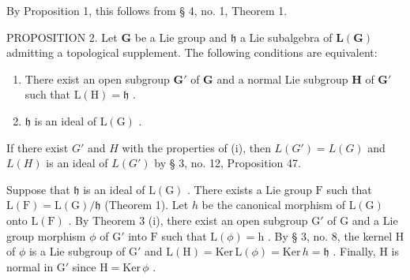 By Proposition 1, this follows from § 4, no. 1, Theorem 1.

PROPOSITION 2. Let \(\mathbf{G}\) be a Lie group and \(\mathfrak{h}\) a Lie subalgebra of \(\mathbf{L}(\mathbf{G})\) admitting a topological supplement. The following conditions are equivalent:

\begin{enumerate}
\def\labelenumi{(\roman{enumi})}
\item
  There exist an open subgroup \(\mathbf{G}'\) of \(\mathbf{G}\) and a normal Lie subgroup \(\mathbf{H}\) of \(\mathbf{G}'\) such that \(\mathrm{L(H)} = \mathfrak{h}\) .
\item
  \(\mathfrak{h}\) is an ideal of \(\mathrm{L}(\mathrm{G})\) .
\end{enumerate}

If there exist \(G'\) and \(H\) with the properties of (i), then \(L(G') = L(G)\) and \(L(H)\) is an ideal of \(L(G')\) by § 3, no. 12, Proposition 47.

Suppose that \(\mathfrak{h}\) is an ideal of \(\mathrm{L}(\mathrm{G})\) . There exists a Lie group \(\mathrm{F}\) such that \(\mathrm{L}(\mathrm{F}) = \mathrm{L}(\mathrm{G}) / \mathfrak{h}\) (Theorem 1). Let \(h\) be the canonical morphism of \(\mathrm{L}(\mathrm{G})\) onto \(\mathrm{L}(\mathrm{F})\) . By Theorem 3 (i), there exist an open subgroup \(\mathrm{G}'\) of \(\mathrm{G}\) and a Lie group morphism \(\phi\) of \(\mathrm{G}'\) into \(\mathrm{F}\) such that \(\mathrm{L}(\phi) = \mathrm{h}\) . By § 3, no. 8, the kernel \(\mathrm{H}\) of \(\phi\) is a Lie subgroup of \(\mathrm{G}'\) and \(\mathrm{L}(\mathrm{H}) = \mathrm{Ker} \, \mathrm{L}(\phi) = \mathrm{Ker} \, h = \mathfrak{h}\) . Finally, \(\mathrm{H}\) is normal in \(\mathrm{G}'\) since \(\mathrm{H} = \mathrm{Ker} \, \phi\) .

